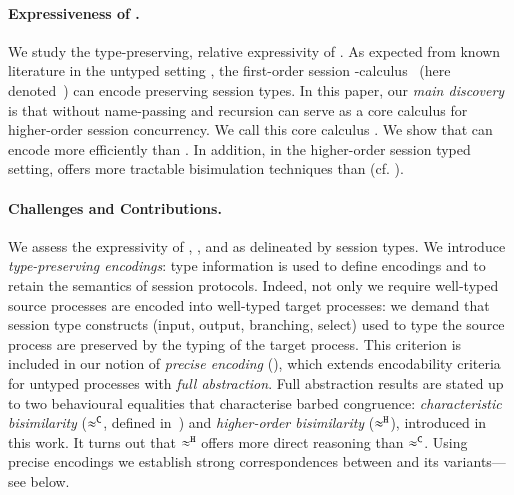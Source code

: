 \documentclass[runningheads]{llncs}
\begin{document}
\paragraph{Expressiveness of \HOp.}
We study the type-preserving, 
relative expressivity of \HOp. %
As expected from 
known literature in the untyped setting \cite{SangiorgiD:expmpa}, 
the first-order session \sessp-calculus~\cite{honda.vasconcelos.kubo:language-primitives} {(here denoted~\sessp)} 
can encode  
\HOp preserving session types. 
In this paper, 
our \emph{main discovery} is 
that 
\HOp 
without
name-passing and recursion
can serve as a 
core calculus    
for higher-order session concurrency.  
We call this core calculus \HO. 
We show that \HO can encode \HOp more efficiently 
than \sessp. In addition, in the higher-order session typed setting, 
\HO offers more tractable bisimulation techniques 
than \sessp (cf. ).



\paragraph{Challenges and Contributions.}

We assess the expressivity  of \HOp, \HO, and \sessp as delineated by session types. 
We introduce \emph{type-preserving encodings}:
type information is used to define encodings
and to retain the semantics of session protocols. 
Indeed,  not only we require 
well-typed source processes are encoded into 
well-typed target processes: 
we demand that session type constructs (input, output, branching, select) used to type the source process
are preserved by the typing of the target process.
This criterion is included in 
our notion of \emph{precise encoding} (), which 
extends encodability criteria for untyped processes with 
\emph{full abstraction}.
{Full abstraction results are stated
up to two
behavioural equalities that characterise barbed congruence:
\emph{characteristic bisimilarity} ($\approx^\mathtt{C}$, defined in~\cite{characteristic_bis})
and 
\emph{higher-order bisimilarity} ($\approx^\mathtt{H}$), introduced in this
work.
It turns out that $\approx^\mathtt{H}$ offers more direct  reasoning than $\approx^\mathtt{C}$. }
Using precise encodings we establish strong correspondences between 
\HOp and its variants---see 
below.
\end{document}
